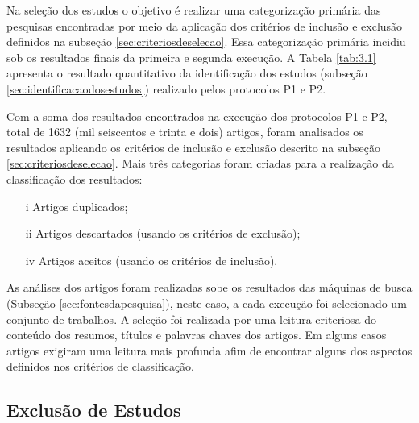 Na seleção dos estudos o objetivo é realizar uma categorização primária das pesquisas encontradas por meio da aplicação dos critérios de inclusão e exclusão definidos na subseção \ref{sec:criteriosdeselecao}. Essa categorização primária incidiu sob os resultados finais da primeira e segunda execução. A Tabela \ref{tab:3.1} apresenta o resultado quantitativo da identificação dos estudos (subseção \ref{sec:identificacaodosestudos}) realizado pelos protocolos P1 e P2.

\begin{table}[H]
\centering
\caption{Total de artigos, teses e dissertações identificados na pesquisa.}
\label{tab:3.1}
\end{table}

Com a soma dos resultados encontrados na execução dos protocolos P1 e P2, total de 1632 (mil seiscentos e trinta e dois) artigos, foram analisados os resultados aplicando os critérios de inclusão e exclusão descrito na subseção \ref{sec:criteriosdeselecao}. Mais três categorias foram criadas para a realização da classificação dos resultados:

\begin{itemize}
\item [i] Artigos duplicados;
\item [ii] Artigos descartados (usando os critérios de exclusão);
\item [iv] Artigos aceitos (usando os critérios de inclusão).
\end{itemize}

As análises dos artigos foram realizadas sobe os resultados das máquinas de busca (Subseção \ref{sec:fontesdapesquisa}), neste caso, a cada execução foi selecionado um conjunto de trabalhos. A seleção foi realizada por uma leitura criteriosa do conteúdo dos resumos, títulos e palavras chaves dos artigos. Em alguns casos artigos exigiram uma leitura mais profunda afim de encontrar alguns dos aspectos definidos nos critérios de classificação.

\subsection{Exclusão de Estudos}
\label{sec:exclusaoestudos}

